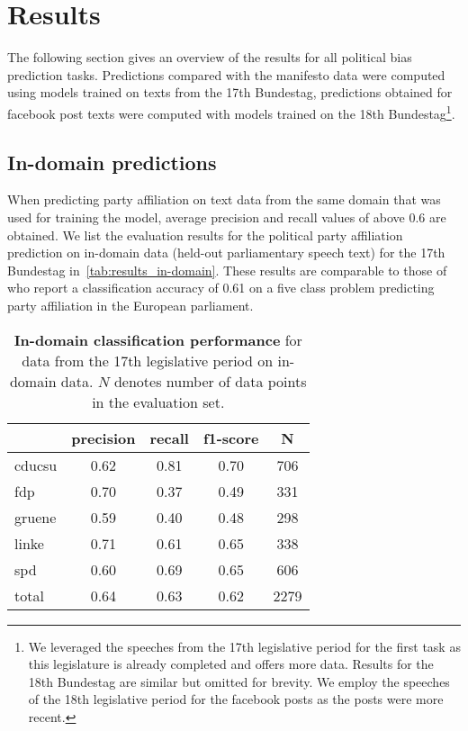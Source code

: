 \documentclass[11pt]{article}
\begin{document}
\section{Results}\label{sec:results}

The following section gives an overview of the results for all political bias prediction tasks. 
Predictions compared with the manifesto data were computed using models trained on texts from the 17th Bundestag, predictions obtained for facebook post texts were computed with models trained on the 18th Bundestag\footnote{We leveraged the speeches from the 17th legislative period for the first task as this legislature is already completed and offers more data. Results for the 18th Bundestag are similar but omitted for brevity. We employ the speeches of the 18th legislative period for the facebook posts as the posts were more recent.}.

\subsection{In-domain predictions}

When predicting party affiliation on text data from the same domain that was used for training the model, average precision and recall values of above 0.6 are obtained. We list the evaluation results for the political party affiliation prediction on in-domain data (held-out parliamentary speech text) for the 17th Bundestag in~\autoref{tab:results_in-domain}.
These results are comparable to those of~\cite{Hirst2014} who report a classification accuracy of 0.61 on a five class problem predicting party affiliation in the European parliament.


\begin{table}[t]
\caption{
\label{tab:results_in-domain}
{\bf In-domain classification performance} for data from the 17th legislative period on in-domain data. $N$ denotes number of data points in the evaluation set.
}
\begin{center}
\begin{tabular}{lcccc}
    &         precision    &recall &  f1-score  & N  \\
\hline \hline
       cducsu   &    0.62  &    0.81  &    0.70  &     706\\
        fdp    &   0.70   &   0.37  &    0.49    &   331\\
     gruene &      0.59  &    0.40   &   0.48   &    298\\
      linke    &   0.71   &   0.61  &    0.65    &   338\\
        spd   &    0.60   &   0.69  &    0.65   &    606\\
\hline
 total &      0.64   &   0.63   &   0.62    &  2279 
%
\end{tabular}
\end{center}
\end{table}
\end{document}
